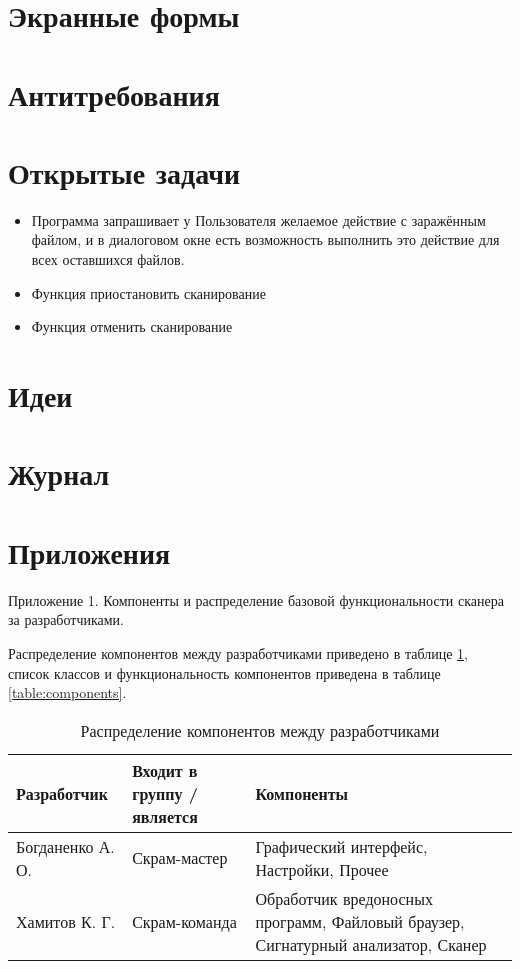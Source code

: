\section{Экранные формы}
\section{Антитребования}
\section{Открытые задачи}
\begin{itemize}
\item Программа запрашивает у Пользователя желаемое действие с заражённым файлом, и в диалоговом окне есть возможность выполнить это действие для всех оставшихся файлов.
\item Функция приостановить сканирование
\item Функция отменить сканирование
\end{itemize}
\section{Идеи}
\section{Журнал}
\section{Приложения}
Приложение 1. Компоненты и распределение базовой функциональности сканера за разработчиками.

Распределение компонентов между разработчиками приведено в таблице \ref{table:responsibilities}, список классов и функциональность компонентов приведена в таблице \ref{table:components}.
\begin{table}[h]
\centering
\begin{tabular}{|l|p{3cm}|p{3cm}|}
\hline
Разработчик & Входит в группу / является & Компоненты \\
\hline
Богданенко А. О. & Скрам-мастер & Графический интерфейс, Настройки, Прочее \\
\hline
Хамитов К. Г. & Скрам-команда & Обработчик вредоносных программ, Файловый браузер, Сигнатурный анализатор, Сканер \\
\hline
\end{tabular}
\caption{Распределение компонентов между разработчиками}
\label{table:responsibilities}
\end{table}

